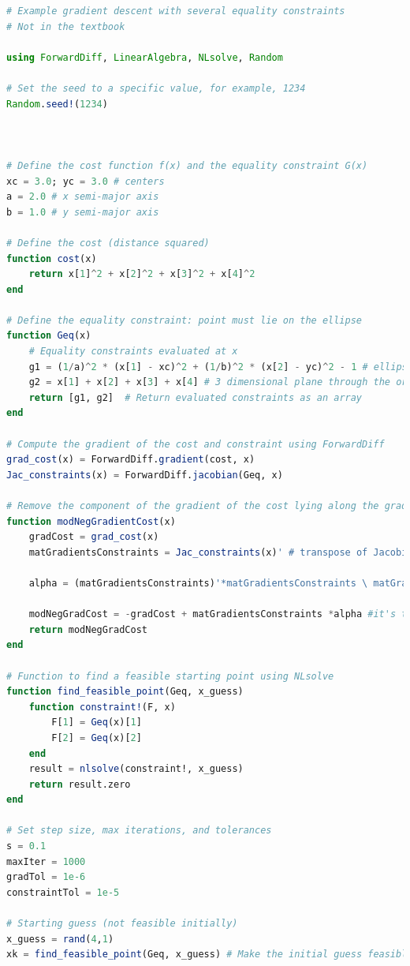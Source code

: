 \begin{lstlisting}[language=Julia,style=mystyle]
# Example gradient descent with several equality constraints
# Not in the textbook

using ForwardDiff, LinearAlgebra, NLsolve, Random

# Set the seed to a specific value, for example, 1234
Random.seed!(1234)



# Define the cost function f(x) and the equality constraint G(x)
xc = 3.0; yc = 3.0 # centers
a = 2.0 # x semi-major axis
b = 1.0 # y semi-major axis

# Define the cost (distance squared)
function cost(x)
    return x[1]^2 + x[2]^2 + x[3]^2 + x[4]^2
end

# Define the equality constraint: point must lie on the ellipse
function Geq(x)
    # Equality constraints evaluated at x
    g1 = (1/a)^2 * (x[1] - xc)^2 + (1/b)^2 * (x[2] - yc)^2 - 1 # ellipse in R4
    g2 = x[1] + x[2] + x[3] + x[4] # 3 dimensional plane through the origin
    return [g1, g2]  # Return evaluated constraints as an array
end

# Compute the gradient of the cost and constraint using ForwardDiff
grad_cost(x) = ForwardDiff.gradient(cost, x)
Jac_constraints(x) = ForwardDiff.jacobian(Geq, x)

# Remove the component of the gradient of the cost lying along the gradient of the constraints
function modNegGradientCost(x)
    gradCost = grad_cost(x)
    matGradientsConstraints = Jac_constraints(x)' # transpose of Jacobian for constraint gradients
    
    alpha = (matGradientsConstraints)'*matGradientsConstraints \ matGradientsConstraints'*gradCost
    
    modNegGradCost = -gradCost + matGradientsConstraints *alpha #it's the negative of the last vector in the matrix when doing Gradient Descent 
    return modNegGradCost
end

# Function to find a feasible starting point using NLsolve
function find_feasible_point(Geq, x_guess)
    function constraint!(F, x)
        F[1] = Geq(x)[1]
        F[2] = Geq(x)[2]
    end
    result = nlsolve(constraint!, x_guess)
    return result.zero
end

# Set step size, max iterations, and tolerances
s = 0.1
maxIter = 1000
gradTol = 1e-6
constraintTol = 1e-5

# Starting guess (not feasible initially)
x_guess = rand(4,1)
xk = find_feasible_point(Geq, x_guess) # Make the initial guess feasible


\end{lstlisting}
